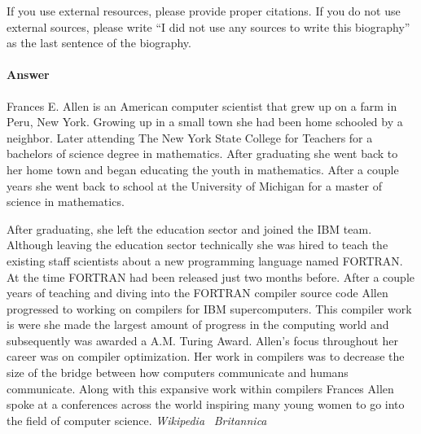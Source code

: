 \documentclass{article}
\begin{document}
If you use external resources, please provide
proper citations. If you do not use external sources, please write ``I did not
use any sources to write this biography'' as the last sentence of the
biography.


\paragraph{Answer}
Frances E. Allen is an American computer scientist that grew up on a farm in Peru,
New York. Growing up in a small town she had been home schooled by a neighbor.
Later attending The New York State College for Teachers for a bachelors of science
degree in mathematics. After graduating she went back to her home town and began
educating the youth in mathematics. After a couple years she went back to school
at the University of Michigan for a master of science in mathematics.

After graduating, she left the education sector and joined the IBM team. Although
leaving the education sector technically she was hired to teach the existing
staff scientists about a new programming language named FORTRAN. At the time FORTRAN
had been released just two months before. After a couple years of teaching and
diving into the FORTRAN compiler source code Allen progressed to working on
compilers for IBM supercomputers. This compiler work is were she made the
largest amount of progress in the computing world and subsequently was awarded
a A.M. Turing Award. Allen's focus throughout her career was on compiler optimization.
Her work in compilers was to decrease the size of the bridge between how computers
communicate and humans communicate. Along with this expansive work within compilers
Frances Allen spoke at a conferences across the world inspiring many young women
to go into the field of computer science.
\emph{Wikipedia}~\cite{wikipedia}
\emph{Britannica}~\cite{britannica}

 \newpage
 
 
\end{document}
